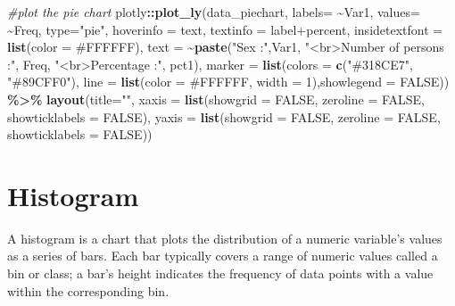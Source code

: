 \documentclass[
]{book}
\newenvironment{Shaded}{\begin{snugshade}}{\end{snugshade}}
\newcommand{\AttributeTok}[1]{\textcolor[rgb]{0.13,0.29,0.53}{#1}}
\newcommand{\CommentTok}[1]{\textcolor[rgb]{0.56,0.35,0.01}{\textit{#1}}}
\newcommand{\ConstantTok}[1]{\textcolor[rgb]{0.56,0.35,0.01}{#1}}
\newcommand{\DecValTok}[1]{\textcolor[rgb]{0.00,0.00,0.81}{#1}}
\newcommand{\FunctionTok}[1]{\textcolor[rgb]{0.13,0.29,0.53}{\textbf{#1}}}
\newcommand{\NormalTok}[1]{#1}
\newcommand{\SpecialCharTok}[1]{\textcolor[rgb]{0.81,0.36,0.00}{\textbf{#1}}}
\newcommand{\StringTok}[1]{\textcolor[rgb]{0.31,0.60,0.02}{#1}}
\begin{document}
\begin{Shaded}
\begin{Highlighting}[]
\CommentTok{\#plot the pie chart}
\NormalTok{plotly}\SpecialCharTok{::}\FunctionTok{plot\_ly}\NormalTok{(data\_piechart, }\AttributeTok{labels=} \SpecialCharTok{\textasciitilde{}}\NormalTok{Var1,}
          \AttributeTok{values=} \SpecialCharTok{\textasciitilde{}}\NormalTok{Freq, }\AttributeTok{type=}\StringTok{"pie"}\NormalTok{,}
          \AttributeTok{hoverinfo =} \StringTok{\textquotesingle{}text\textquotesingle{}}\NormalTok{,}
          \AttributeTok{textinfo =} \StringTok{\textquotesingle{}label+percent\textquotesingle{}}\NormalTok{,}
          \AttributeTok{insidetextfont =} \FunctionTok{list}\NormalTok{(}\AttributeTok{color =} \StringTok{\textquotesingle{}\#FFFFFF\textquotesingle{}}\NormalTok{),}
          \AttributeTok{text =} \SpecialCharTok{\textasciitilde{}}\FunctionTok{paste}\NormalTok{(}\StringTok{"Sex :"}\NormalTok{,Var1,}
                        \StringTok{"\textless{}br\textgreater{}Number of persons :"}\NormalTok{, Freq,}
                        \StringTok{"\textless{}br\textgreater{}Percentage :"}\NormalTok{, pct1),}
          \AttributeTok{marker =} \FunctionTok{list}\NormalTok{(}\AttributeTok{colors =} \FunctionTok{c}\NormalTok{(}\StringTok{"\#318CE7"}\NormalTok{, }\StringTok{"\#89CFF0"}\NormalTok{),}
                        \AttributeTok{line =} \FunctionTok{list}\NormalTok{(}\AttributeTok{color =} \StringTok{\textquotesingle{}\#FFFFFF\textquotesingle{}}\NormalTok{, }\AttributeTok{width =} \DecValTok{1}\NormalTok{),}\AttributeTok{showlegend =} \ConstantTok{FALSE}\NormalTok{)) }\SpecialCharTok{\%\textgreater{}\%}
    \FunctionTok{layout}\NormalTok{(}\AttributeTok{title=}\StringTok{""}\NormalTok{,}
           \AttributeTok{xaxis =} \FunctionTok{list}\NormalTok{(}\AttributeTok{showgrid =} \ConstantTok{FALSE}\NormalTok{, }\AttributeTok{zeroline =} \ConstantTok{FALSE}\NormalTok{, }\AttributeTok{showticklabels =} \ConstantTok{FALSE}\NormalTok{),}
           \AttributeTok{yaxis =} \FunctionTok{list}\NormalTok{(}\AttributeTok{showgrid =} \ConstantTok{FALSE}\NormalTok{, }\AttributeTok{zeroline =} \ConstantTok{FALSE}\NormalTok{, }\AttributeTok{showticklabels =} \ConstantTok{FALSE}\NormalTok{))}
\end{Highlighting}
\end{Shaded}

\hypertarget{histogram}{%
\section{Histogram}\label{histogram}}

A histogram is a chart that plots the distribution of a numeric variable's values as a series of bars. Each bar typically covers a range of numeric values called a bin or class; a bar's height indicates the frequency of data points with a value within the corresponding bin.
\end{document}
